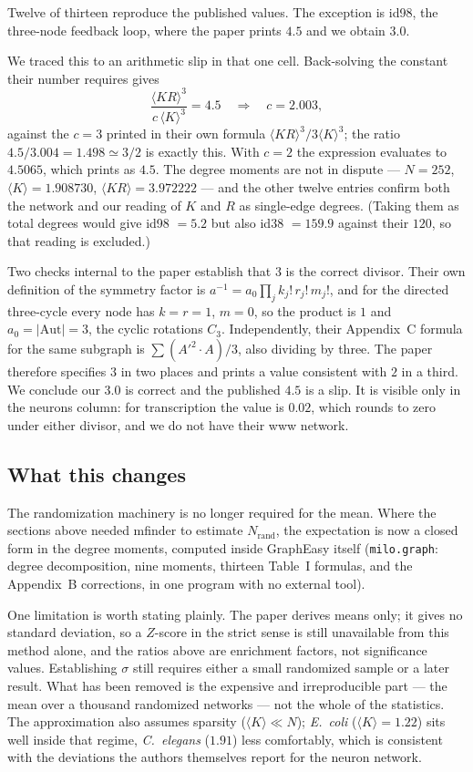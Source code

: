 \documentclass[11pt]{article}
\begin{document}
Twelve of thirteen reproduce the published values. The exception is id98, the
three-node feedback loop, where the paper prints $4.5$ and we obtain $3.0$.

We traced this to an arithmetic slip in that one cell. Back-solving the constant
their number requires gives
\[
\frac{\langle KR\rangle^{3}}{c\,\langle K\rangle^{3}}=4.5
\quad\Longrightarrow\quad c=2.003 ,
\]
against the $c=3$ printed in their own formula $\langle KR\rangle^{3}/3\langle
K\rangle^{3}$; the ratio $4.5/3.004=1.498\simeq 3/2$ is exactly this. With
$c=2$ the expression evaluates to $4.5065$, which prints as $4.5$. The degree
moments are not in dispute --- $N=252$, $\langle K\rangle=1.908730$, $\langle
KR\rangle=3.972222$ --- and the other twelve entries confirm both the network
and our reading of $K$ and $R$ as single-edge degrees. (Taking them as total
degrees would give id98 $=5.2$ but also id38 $=159.9$ against their $120$,
so that reading is excluded.)

Two checks internal to the paper establish that $3$ is the correct divisor.
Their own definition of the symmetry factor is $a^{-1}=a_{0}\prod_{j}
k_j!\,r_j!\,m_j!$, and for the directed three-cycle every node has $k=r=1$,
$m=0$, so the product is $1$ and $a_{0}=|\mathrm{Aut}|=3$, the cyclic rotations
$C_3$. Independently, their Appendix~C formula for the same subgraph is
$\sum (A'^{2}\!\cdot\!A)/3$, also dividing by three. The paper therefore
specifies $3$ in two places and prints a value consistent with $2$ in a third.
We conclude our $3.0$ is correct and the published $4.5$ is a slip. It is
visible only in the neurons column: for transcription the value is $0.02$,
which rounds to zero under either divisor, and we do not have their www network.

\subsection{What this changes}

The randomization machinery is no longer required for the mean. Where the
sections above needed mfinder to estimate $N_{\mathrm{rand}}$, the expectation is
now a closed form in the degree moments, computed inside GraphEasy itself
(\texttt{milo.graph}: degree decomposition, nine moments, thirteen Table~I
formulas, and the Appendix~B corrections, in one program with no external tool).

One limitation is worth stating plainly. The paper derives means only; it gives
no standard deviation, so a $Z$-score in the strict sense is still unavailable
from this method alone, and the ratios above are enrichment factors, not
significance values. Establishing $\sigma$ still requires either a small
randomized sample or a later result. What has been removed is the expensive and
irreproducible part --- the mean over a thousand randomized networks --- not the
whole of the statistics. The approximation also assumes sparsity
($\langle K\rangle\ll N$); \textit{E.\ coli} ($\langle K\rangle=1.22$) sits well
inside that regime, \textit{C.\ elegans} ($1.91$) less comfortably, which is
consistent with the deviations the authors themselves report for the neuron
network.
\end{document}
